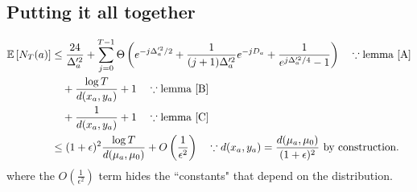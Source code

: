 \documentclass[11pt]{article}
\begin{document}
\subsection{Putting it all together}
\begin{align*}\mathbb{E}\left[ N_T(a) \right]&\le \frac{24}{\Delta_a'^2} + \sum_{j=0}^{T-1}\Theta\left(e^{-j\Delta_a'^2/2}+ \frac{1}{(j+1)\Delta_a'^2}e^{-jD_a}+ \frac{1}{e^{j\Delta_a'^2/4}-1}\right) \quad\because \mbox{lemma \ref{A}}\\
 &\quad+\frac{\log T}{d(x_a,y_a)} + 1 \quad \because \mbox{lemma \ref{B}}\\
 &\quad+ \frac{1}{d(x_a,y_a)}+ 1\quad \because \mbox{lemma \ref{C}}\\
 &\le (1+\epsilon)^2 \frac{\log T}{d(\mu_a,\mu_0)} + O\left(\frac{1}{\epsilon^2}\right) \quad \because d(x_a,y_a) = \frac{d(\mu_a,\mu_0)}{(1+\epsilon)^2} \mbox{ by construction.}
\end{align*}
where the $\displaystyle O\left(\frac{1}{\epsilon^2}\right)$ term hides the ``constants" that depend on the distribution.



\end{document}
